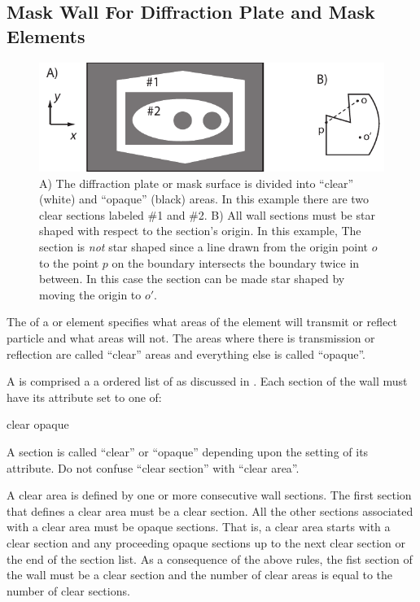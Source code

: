 \subsection{Mask Wall For Diffraction Plate and Mask Elements}
\label{s:masking.wall}

\begin{figure}[tb]
  \centering
  \includegraphics[width=5in]{diffraction-plate.pdf}
  \caption[Example mask wall]{
A) The diffraction plate or mask surface is divided into ``clear'' (white) and ``opaque'' (black)
areas. In this example there are two clear sections labeled \#1 and \#2. B) All wall sections must
be star shaped with respect to the section's origin. In this example, The section is {\em not} star
shaped since a line drawn from the origin point $o$ to the point $p$ on the boundary intersects the
boundary twice in between. In this case the section can be made star shaped by moving the origin to
$o'$.
  }
  \label{f:diff.plate}
\end{figure}

The  of a  or  element specifies what areas of the element
will transmit or reflect particle and what areas will not. The areas where there is transmission or
reflection are called ``clear'' areas and everything else is called ``opaque''.

A  is comprised a a ordered list of  as discussed in
. Each section of the wall must have its  attribute set to one of:
\begin{example}
  clear
  opaque
\end{example}
A section is called ``clear'' or ``opaque'' depending upon the setting
of its  attribute. Do not confuse ``clear section'' with 
``clear area''.

A clear area is defined by one or more consecutive wall sections. The first section that defines a
clear area must be a clear section.  All the other sections associated with a clear area must be
opaque sections.  That is, a clear area starts with a clear section and any proceeding opaque
sections up to the next clear section or the end of the section list. As a consequence of the above
rules, the fist section of the wall must be a clear section and the number of clear areas is equal
to the number of clear sections.

